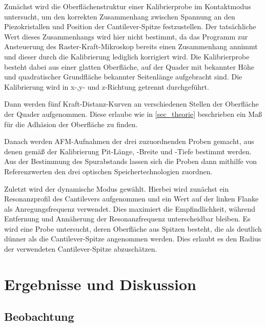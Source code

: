 \documentclass[
	a4paper,
	12pt,
	pagesize,
	ngerman
]{scrartcl}
\begin{document}
	Zunächst wird die Oberflächenstruktur einer Kalibrierprobe im Kontaktmodus untersucht, um den korrekten Zusammenhang zwischen Spannung an den Piezokristallen und Position der Cantilever-Spitze festzustellen.
	Der tatsächliche Wert dieses Zusammenhangs wird hier nicht bestimmt, da das Programm zur Ansteuerung des Raster-Kraft-Mikroskop bereits einen Zusammenhang annimmt und dieser durch die Kalibrierung lediglich korrigiert wird.
	Die Kalibrierprobe besteht dabei aus einer glatten Oberfläche, auf der Quader mit bekannter Höhe und quadratischer Grundfläche bekannter Seitenlänge aufgebracht sind.
	Die Kalibrierung wird in x-,y- und z-Richtung getrennt durchgeführt.

	Dann werden fünf Kraft-Distanz-Kurven an verschiedenen Stellen der Oberfläche der Quader aufgenommen.
	Diese erlaube wie in \cref{sec_theorie} beschrieben ein Maß für die Adhäsion der Oberfläche zu finden. %

	Danach werden AFM-Aufnahmen der drei zuzuordnenden Proben gemacht, aus denen gemäß der Kalibrierung Pit-Länge, -Breite und -Tiefe bestimmt werden.
	Aus der Bestimmung des Spurabstands lassen sich die Proben dann mithilfe von Referenzwerten den drei optischen Speichertechnologien zuordnen.

	Zuletzt wird der dynamische Modus gewählt.
	Hierbei wird zunächst ein Resonanzprofil des Cantilevers aufgenommen und ein Wert auf der linken Flanke als Anregungsfrequenz verwendet.
	Dies maximiert die Empfindlichkeit, während Entfernung und Annäherung der Resonanzfrequenz unterscheidbar bleiben.
	Es wird eine Probe untersucht, deren Oberfläche aus Spitzen besteht, die als deutlich dünner als die Cantilever-Spitze angenommen werden.
	Dies erlaubt es den Radius der verwendeten Cantilever-Spitze abzuschätzen.
	

	\section{Ergebnisse und Diskussion}


	\subsection{Beobachtung}

\end{document}

